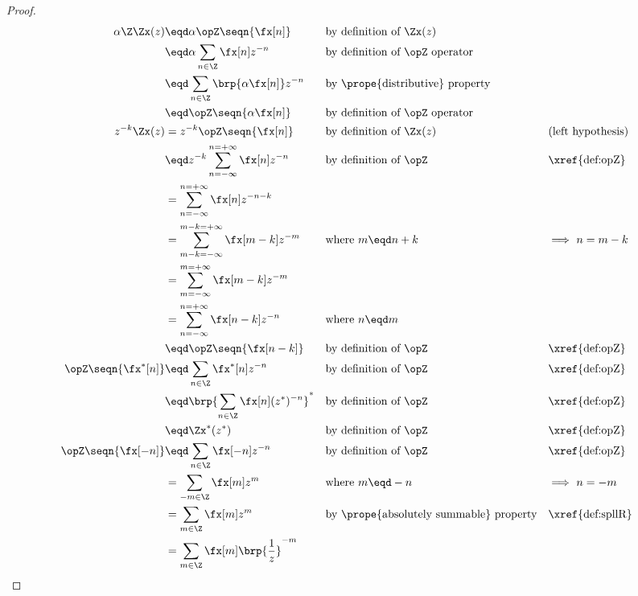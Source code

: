 \begin{proof}
\begin{align*}
  \alpha\Z\Zx(z)
    &\eqd \alpha \opZ \seqn{\fx[n]}                && \text{by definition of $\Zx(z)$}
  \\&\eqd \alpha \sum_{n\in\Z} \fx[n] z^{-n}       && \text{by definition of $\opZ$ operator}
  \\&\eqd \sum_{n\in\Z} \brp{\alpha\fx[n]} z^{-n}  && \text{by \prope{distributive} property}
  \\&\eqd \opZ\seqn{\alpha\fx[n]}                  && \text{by definition of $\opZ$ operator}
  \\
  z^{-k}\Zx(z)
    &= z^{-k} \opZ\seqn{\fx[n]}
    && \text{by definition of $\Zx(z)$}
    && \text{(left hypothesis)}
  \\&\eqd z^{-k}\sum_{n=-\infty}^{n=+\infty} \fx[n] z^{-n}
    && \text{by definition of $\opZ$}
    && \text{\xref{def:opZ}}
  \\&=          \sum_{n=-\infty}^{n=+\infty} \fx[n] z^{-n-k}
  \\&=          \sum_{m-k=-\infty}^{m-k=+\infty} \fx[m-k] z^{-m}
    && \text{where $m\eqd n+k$}
    && \text{$\implies$ $n=m-k$}
  \\&=          \sum_{m=-\infty}^{m=+\infty} \fx[m-k] z^{-m}
  \\&=          \sum_{n=-\infty}^{n=+\infty} \fx[n-k] z^{-n}
    && \text{where $n\eqd m$}
  \\&\eqd \opZ\seqn{\fx[n-k]}
    && \text{by definition of $\opZ$}
    && \text{\xref{def:opZ}}
  \\
  \opZ\seqn{\fx^\ast[n]}
    &\eqd \sum_{n\in\Z}\fx^\ast[n] z^{-n}
    && \text{by definition of $\opZ$}
    && \text{\xref{def:opZ}}
  \\&\eqd \brp{\sum_{n\in\Z}\fx[n] (z^\ast)^{-n}}^\ast
    && \text{by definition of $\opZ$}
    && \text{\xref{def:opZ}}
  \\&\eqd \Zx^\ast(z^\ast)
    && \text{by definition of $\opZ$}
    && \text{\xref{def:opZ}}
  \\
  \opZ\seqn{\fx[-n]}
    &\eqd \sum_{n\in\Z}\fx[-n] z^{-n}
    && \text{by definition of $\opZ$}
    && \text{\xref{def:opZ}}
  \\&= \sum_{-m\in\Z}\fx[m] z^{m}
    && \text{where $m\eqd -n$}
    && \text{$\implies$ $n=-m$}
  \\&= \sum_{m\in\Z}\fx[m] z^{m}
    && \text{by \prope{absolutely summable} property}
    && \text{\xref{def:spllR}}
  \\&= \sum_{m\in\Z}\fx[m] \brp{\frac{1}{z}}^{-m}

\end{align*}
\end{proof}
